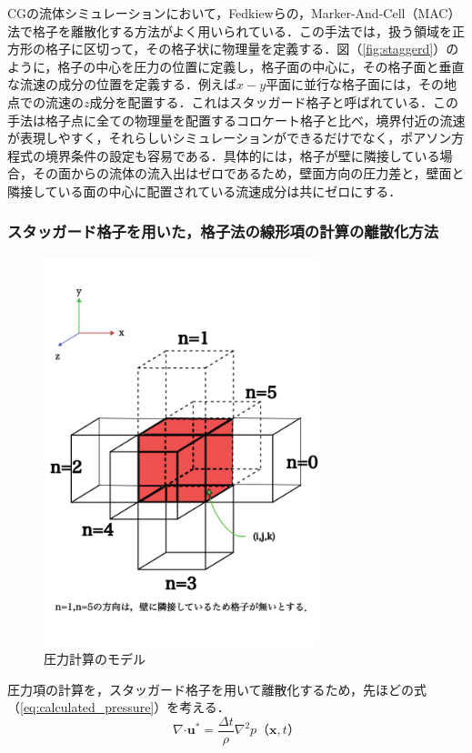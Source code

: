 \documentclass[a4j,12pt]{jreport}
\begin{document}
CGの流体シミュレーションにおいて，Fedkiewらの，Marker-And-Cell（MAC）法で格子を離散化する方法がよく用いられている．この手法では，扱う領域を正方形の格子に区切って，その格子状に物理量を定義する．図（\ref{fig:staggerd}）のように，格子の中心を圧力の位置に定義し，格子面の中心に，その格子面と垂直な流速の成分の位置を定義する．例えば$x-y$平面に並行な格子面には，その地点での流速の$z$成分を配置する．これはスタッガード格子と呼ばれている．この手法は格子点に全ての物理量を配置するコロケート格子と比べ，境界付近の流速が表現しやすく，それらしいシミュレーションができるだけでなく，ポアソン方程式の境界条件の設定も容易である．具体的には，格子が壁に隣接している場合，その面からの流体の流入出はゼロであるため，壁面方向の圧力差と，壁面と隣接している面の中心に配置されている流速成分は共にゼロにする．

\subsubsection{スタッガード格子を用いた，格子法の線形項の計算の離散化方法}
\begin{figure}[htbp]
\begin{center}
\includegraphics[width=80mm]{pressure_model.png}
\caption{圧力計算のモデル}
\label{fig:pressure_model}
\end{center}
\end{figure}
圧力項の計算を，スタッガード格子を用いて離散化するため，先ほどの式（\ref{eq:calculated_pressure}）を考える．
$$\nabla\boldsymbol{\cdot}\bm{u}^* = \frac{\varDelta t}{\rho}\nabla^2 p（\bm{x},t）$$
\end{document}
